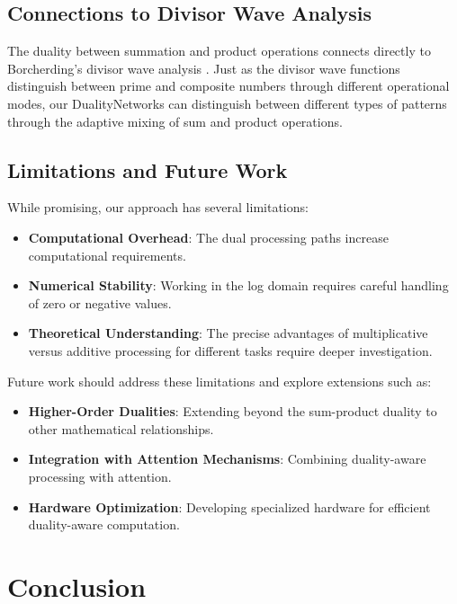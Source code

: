 \documentclass{article}
\begin{document}
\subsection{Connections to Divisor Wave Analysis}

The duality between summation and product operations connects directly to Borcherding's divisor wave analysis \cite{borcherding2023divisor}. Just as the divisor wave functions distinguish between prime and composite numbers through different operational modes, our DualityNetworks can distinguish between different types of patterns through the adaptive mixing of sum and product operations.

\subsection{Limitations and Future Work}

While promising, our approach has several limitations:

\begin{itemize}
    \item \textbf{Computational Overhead}: The dual processing paths increase computational requirements.
    
    \item \textbf{Numerical Stability}: Working in the log domain requires careful handling of zero or negative values.
    
    \item \textbf{Theoretical Understanding}: The precise advantages of multiplicative versus additive processing for different tasks require deeper investigation.
\end{itemize}

Future work should address these limitations and explore extensions such as:

\begin{itemize}
    \item \textbf{Higher-Order Dualities}: Extending beyond the sum-product duality to other mathematical relationships.
    
    \item \textbf{Integration with Attention Mechanisms}: Combining duality-aware processing with attention.
    
    \item \textbf{Hardware Optimization}: Developing specialized hardware for efficient duality-aware computation.
\end{itemize}

\section{Conclusion}
\end{document}
